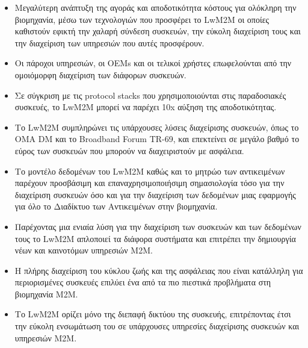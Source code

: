 \begin{itemize}
	\item{Μεγαλύτερη ανάπτυξη της αγοράς και αποδοτικότητα κόστους για ολόκληρη την βιομηχανία,  μέσω των τεχνολογιών που προσφέρει το LwM2M οι οποίες καθιστούν εφικτή την χαλαρή σύνδεση συσκευών, την εύκολη διαχείριση τους και την διαχείριση των υπηρεσιών που αυτές προσφέρουν.}
	\item{Οι πάροχοι υπηρεσιών, οι OEMs και οι τελικοί χρήστες επωφελούνται από την ομοιόμορφη διαχείριση των διάφορων συσκευών.}
	\item{Σε σύγκριση με τις protocol stacks που χρησιμοποιούνται στις παραδοσιακές συσκευές, το LwM2M μπορεί να παρέχει 10x αύξηση της αποδοτικότητας.}
	\item{Το LwM2M συμπληρώνει τις υπάρχουσες λύσεις διαχείρισης συσκευών, όπως το ΟΜΑ DM και το Broadband Forum TR-69, και επεκτείνει σε μεγάλο βαθμό το εύρος των συσκευών που μπορούν να διαχειριστούν με ασφάλεια.}
	\item{Το μοντέλο δεδομένων του LwM2M καθώς και το μητρώο των αντικειμένων παρέχουν προσβάσιμη και επαναχρησιμοποιήσιμη σημασιολογία τόσο για την διαχείριση συσκευών όσο και για την διαχείριση των δεδομένων μιας εφαρμογής για όλο το Διαδίκτυο των Αντικειμένων στην βιομηχανία. }
	\item{Παρέχοντας μια ενιαία λύση για την διαχείριση των συσκευών και των δεδομένων τους το LwM2M απλοποιεί τα διάφορα συστήματα και επιτρέπει την δημιουργία νέων και καινοτόμων υπηρεσιών M2M.}
	\item{Η πλήρης διαχείριση του κύκλου ζωής και της ασφάλειας που είναι κατάλληλη για περιορισμένες συσκευές επιλύει ένα από τα πιο πιεστικά προβλήματα στη βιομηχανία M2M.}
	\item{Το LwM2M ορίζει μόνο της διεπαφή δικτύου της συσκευής, επιτρέποντας έτσι την εύκολη ενσωμάτωση του σε υπάρχουσες υπηρεσίες διαχείρισης συσκευών και υπηρεσιών Μ2Μ.}
\end{itemize}




